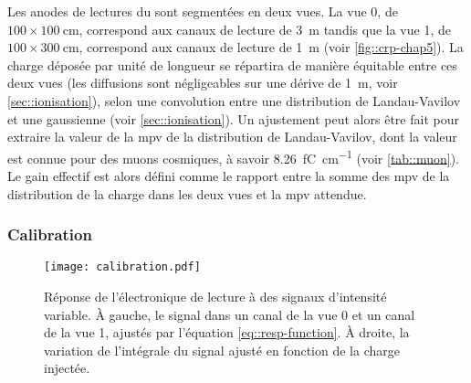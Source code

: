       Les anodes de lectures du \TOO sont segmentées en deux vues. La vue 0, de $100\times\SI{100}{\centi\meter}$, correspond aux canaux de lecture de \SI{3}{\meter} tandis que la vue 1, de $100\times\SI{300}{\centi\meter}$, correspond aux canaux de lecture de \SI{1}{\meter} (voir \autoref{fig::crp-chap5}). La charge déposée par unité de longueur se répartira de manière équitable entre ces deux vues (les diffusions sont négligeables sur une dérive de \SI{1}{\meter}, voir \autoref{sec::ionisation}), selon une convolution entre une distribution de Landau-Vavilov et une gaussienne (voir \autoref{sec::ionisation}). Un ajustement peut alors être fait pour extraire la valeur de la \gls{mpv} de la distribution de Landau-Vavilov, dont la valeur est connue pour des muons cosmiques, à savoir \SI{8.26}{\femto\coulomb\per\centi\meter} (voir \autoref{tab::muon}). Le gain effectif est alors défini comme le rapport entre la somme des \gls{mpv} de la distribution de la charge dans les deux vues et la \gls{mpv} attendue.

      \subsubsection{Calibration}

        \begin{figure}[htbp]
          \centering
          \texttt{[image: calibration.pdf]}
          \caption[Réponse de l'électronique de lecture]{\label{fig::cali-311}Réponse de l'électronique de lecture à des signaux d'intensité variable. À gauche, le signal dans un canal de la vue 0 et un canal de la vue 1, ajustés par l'équation \eqref{eq::resp-function}. À droite, la variation de l'intégrale du signal ajusté en fonction de la charge injectée.}
        \end{figure}

